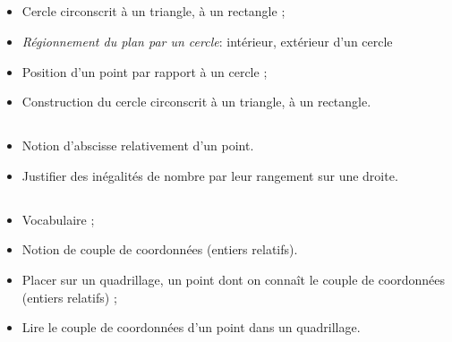 \subsection*{}

\savoir
\begin{itemize}
\item Cercle circonscrit à un triangle, à un rectangle ;
\item \textit{Régionnement du plan par un cercle}: intérieur, extérieur d'un cercle
\end{itemize}
\savoirfaire
\begin{itemize}
\item Position d'un point par rapport à un cercle ;
\item Construction du cercle circonscrit à un triangle, à un rectangle.
\end{itemize}

\subsection*{}

\savoir
\begin{itemize}
\item Notion d'abscisse relativement d'un point.
\end{itemize}
\savoirfaire
\begin{itemize}
\item Justifier des inégalités de nombre par leur rangement sur une droite.
\end{itemize}

\subsection*{}

\savoir
\begin{itemize}
\item Vocabulaire ;
\item Notion de couple de coordonnées (entiers relatifs).
\end{itemize}
\savoirfaire
\begin{itemize}
\item Placer sur un quadrillage, un point dont on connaît le couple de coordonnées (entiers relatifs) ;
\item Lire le couple de coordonnées d'un point dans un quadrillage.
\end{itemize}  

